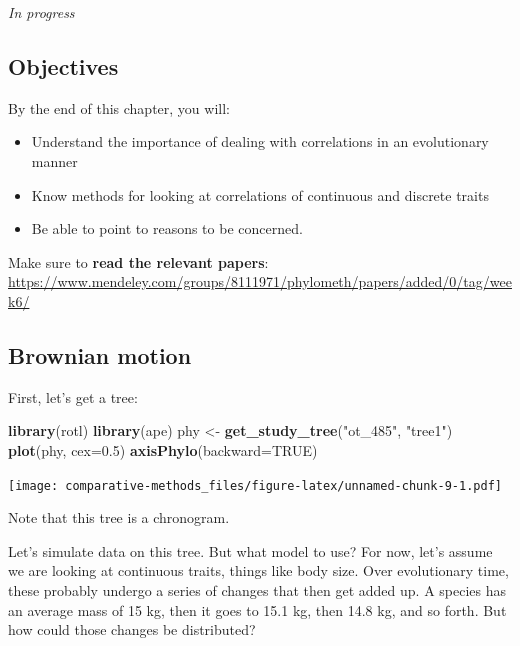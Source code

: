 \documentclass[]{article}
\newenvironment{Shaded}{\begin{snugshade}}{\end{snugshade}}
\newcommand{\DataTypeTok}[1]{\textcolor[rgb]{0.13,0.29,0.53}{#1}}
\newcommand{\FloatTok}[1]{\textcolor[rgb]{0.00,0.00,0.81}{#1}}
\newcommand{\KeywordTok}[1]{\textcolor[rgb]{0.13,0.29,0.53}{\textbf{#1}}}
\newcommand{\NormalTok}[1]{#1}
\newcommand{\OtherTok}[1]{\textcolor[rgb]{0.56,0.35,0.01}{#1}}
\newcommand{\StringTok}[1]{\textcolor[rgb]{0.31,0.60,0.02}{#1}}
\providecommand{\tightlist}{%
  \setlength{\itemsep}{0pt}\setlength{\parskip}{0pt}}
\begin{document}
\emph{In progress}

\hypertarget{objectives-3}{%
\subsection{Objectives}\label{objectives-3}}

By the end of this chapter, you will:

\begin{itemize}
\tightlist
\item
  Understand the importance of dealing with correlations in an evolutionary manner
\item
  Know methods for looking at correlations of continuous and discrete traits
\item
  Be able to point to reasons to be concerned.
\end{itemize}

Make sure to \textbf{read the relevant papers}: \url{https://www.mendeley.com/groups/8111971/phylometh/papers/added/0/tag/week6/}

\hypertarget{brownian-motion}{%
\subsection{Brownian motion}\label{brownian-motion}}

First, let's get a tree:

\begin{Shaded}
\begin{Highlighting}[]
\KeywordTok{library}\NormalTok{(rotl)}
\KeywordTok{library}\NormalTok{(ape)}
\NormalTok{phy <-}\StringTok{ }\KeywordTok{get_study_tree}\NormalTok{(}\StringTok{"ot_485"}\NormalTok{, }\StringTok{"tree1"}\NormalTok{)}
\KeywordTok{plot}\NormalTok{(phy, }\DataTypeTok{cex=}\FloatTok{0.5}\NormalTok{)}
\KeywordTok{axisPhylo}\NormalTok{(}\DataTypeTok{backward=}\OtherTok{TRUE}\NormalTok{)}
\end{Highlighting}
\end{Shaded}

\texttt{[image: comparative-methods\_files/figure-latex/unnamed-chunk-9-1.pdf]}

Note that this tree is a chronogram.

Let's simulate data on this tree. But what model to use? For now, let's assume we are looking at continuous traits, things like body size. Over evolutionary time, these probably undergo a series of changes that then get added up. A species has an average mass of 15 kg, then it goes to 15.1 kg, then 14.8 kg, and so forth. But how could those changes be distributed?
\end{document}
